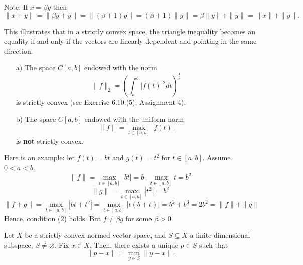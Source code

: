 Note: If \( x = \beta y \) then
\[ \|x + y\| = \|\beta y + y\| = \|(\beta + 1)y\| = (\beta + 1)\|y\| = \beta \|y\| + \|y\| = \|x\| + \|y\|. \]

\begin{moral}
    This illustrates that in a strictly convex space, the triangle inequality becomes an equality if and only if the vectors are linearly dependent and pointing in the same direction.
\end{moral}



\begin{enumerate}
    \item[a)] The space \( C[a,b] \) endowed with the norm 
    \[ \|f\|_2 = \left( \int_a^b |f(t)|^2 dt \right)^{\frac{1}{2}} \]
    is strictly convex (see Exercise 6.10.(5), Assignment 4).
    \item[b)] The space \( C[a,b] \) endowed with the uniform norm
    \[ \|f\| = \max_{t \in [a,b]} |f(t)| \]
    is \textbf{not} strictly convex.
\end{enumerate}
Here is an example: let \( f(t) = bt \) and \( g(t) = t^2 \) for \( t \in [a,b] \). Assume \( 0 < a < b \).
\[ \|f\| = \max_{t \in [a,b]} |bt| = b \cdot \max_{t \in [a,b]} t = b^2 \]
\[ \|g\| = \max_{t \in [a,b]} |t^2| = b^2 \]
\[ \|f + g\| = \max_{t \in [a,b]} |bt + t^2| = \max_{t \in [a,b]} |t(b + t)| = b^2 + b^3 = 2b^2 = \|f\| + \|g\| \]
Hence, condition (2) holds. But \( f \neq \beta g \) for some \( \beta > 0 \).

\begin{theorem}[6.6.3]
Let \( X \) be a strictly convex normed vector space, and \( S \subseteq X \) a finite-dimensional subspace, \( S \neq \varnothing \). Fix \( x \in X \). Then, there exists a unique \( p \in S \) such that
\[ \|p - x\| = \min_{y \in S} \|y - x\|. \]
\end{theorem}

